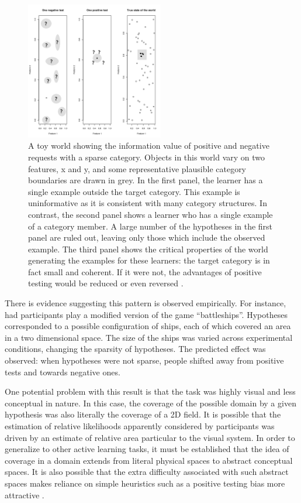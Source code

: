 \documentclass[10pt,letterpaper]{article}
\begin{document}
\begin{figure}[t]
\centering
\includegraphics[width=.45\textwidth,height=6cm]{spdemo.png}
\caption{A toy world showing the information value of positive and negative requests with a sparse category. Objects in this world vary on two features, x and y, and some representative plausible category boundaries are drawn in grey. In the first panel, the learner has a single example outside the target category. This example is uninformative as it is consistent with many category structures. In contrast, the second panel shows a learner who has a single example of a category member. A large number of the hypotheses in the first panel are ruled out, leaving only those which include the observed example. The third panel shows the critical properties of the world generating the examples for these learners: the target category is in fact small and coherent. If it were not, the advantages of positive testing would be reduced or even reversed \cite{navarro2011sparsecat}.}

\label{sparsitydemo}
\end{figure}

There is evidence suggesting this pattern is observed empirically. For instance,  had participants play a modified version of the game ``battleships''. Hypotheses corresponded to a possible configuration of ships, each of which covered an area in a two dimensional space. The size of the ships was varied across experimental conditions, changing the sparsity of hypotheses. The predicted effect was observed: when hypotheses were not sparse, people shifted away from positive tests and towards negative ones. 

One potential problem with this result is that the task was highly visual and less conceptual in nature. In this case, the coverage of the possible domain by a given hypothesis was also literally the coverage of a 2D field. It is possible that the estimation of relative likelihoods apparently considered by participants was driven by an estimate of relative area particular to the visual system. In order to generalize to other active learning tasks, it must be established that the idea of coverage in a domain extends from literal physical spaces to abstract conceptual spaces. It is also possible that the extra difficulty associated with such abstract spaces makes reliance on simple heuristics such as a positive testing bias more attractive \cite{cherubini2010questionasymmetry}.
\end{document}
